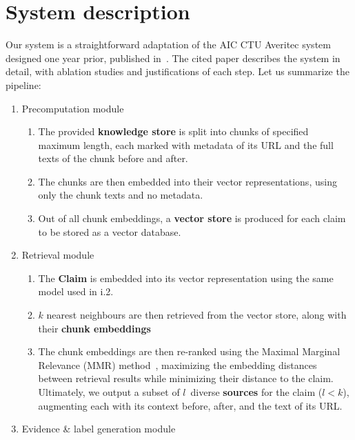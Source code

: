 
\section{System description}
\label{sec:system}

Our system is a straightforward adaptation of the AIC CTU Averitec system designed one year prior, published in~\citealt{ullrich-etal-2024-aic}.
The cited paper describes the system in detail, with ablation studies and justifications of each step.
Let us summarize the pipeline:

\begin{enumerate}[label=\roman*.]  %
\item Precomputation module
\begin{enumerate}[label=\arabic*.]  %
    \item The provided \textbf{knowledge store} \cite{averitec2024} is split into chunks of specified maximum length, each marked with metadata of its URL and the full texts of the chunk before and after.
    \item The chunks are then embedded into their vector representations, using only the chunk texts and no metadata.
    \item Out of all chunk embeddings, a \textbf{vector store} is produced for each claim to be stored as a vector database.
\end{enumerate}
\item Retrieval module
\begin{enumerate}[label=\arabic*.]  %
    \item The \textbf{Claim} is embedded into its vector representation using the same model used in i.2.
    \item $k$ nearest neighbours are then retrieved from the vector store, along with their \textbf{chunk embeddings}
    \item The chunk embeddings are then re-ranked using the Maximal Marginal Relevance (MMR) method~\cite{carbonell-mmr}, maximizing the embedding distances between retrieval results while minimizing their distance to the claim.
    Ultimately, we output a subset of $l$~diverse \textbf{sources} for the claim ($l<k$), augmenting each with its context before, after, and the text of its URL.
\end{enumerate}
\item Evidence \& label generation module
\begin{enumerate}[label=\arabic*.]  %

\end{enumerate}
\end{enumerate}
